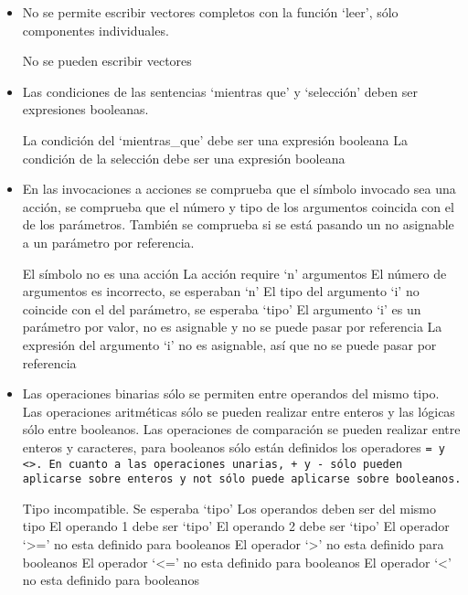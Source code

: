 \begin{itemize}
    \item No se permite escribir vectores completos con la función `leer', sólo componentes individuales.

    \begin{codigo}
    No se pueden escribir vectores
    \end{codigo}


    \item Las condiciones de las sentencias `mientras que' y `selección' deben ser expresiones booleanas.

    \begin{codigo}
    La condición del `mientras_que' debe ser una expresión booleana
    La condición de la selección debe ser una expresión booleana
    \end{codigo}


    \item En las invocaciones a acciones se comprueba que el símbolo invocado sea una acción, se comprueba que el número y tipo de los argumentos coincida con el de los parámetros. También se comprueba si se está pasando un no asignable a un parámetro por referencia.

    \begin{codigo}
    El símbolo no es una acción
    La acción require `n' argumentos
    El número de argumentos es incorrecto, se esperaban `n'
    El tipo del argumento `i' no coincide con el del parámetro, se esperaba `tipo'
    El argumento `i' es un parámetro por valor, no es asignable y no se puede pasar por referencia
    La expresión del argumento `i' no es asignable, así que no se puede pasar por referencia
    \end{codigo}


\item Las operaciones binarias sólo se permiten entre operandos del mismo tipo. Las operaciones aritméticas sólo se pueden realizar entre enteros y las lógicas sólo entre booleanos. Las operaciones de comparación se pueden realizar entre enteros y caracteres, para booleanos sólo están definidos los operadores \tt{=} y \tt{<>}. En cuanto a las operaciones unarias, \tt{+} y \tt{-} sólo pueden aplicarse sobre enteros y \tt{not} sólo puede aplicarse sobre booleanos.

    \begin{codigo}
    Tipo incompatible. Se esperaba `tipo'
    Los operandos deben ser del mismo tipo
    El operando 1 debe ser `tipo'
    El operando 2 debe ser `tipo'
    El operador `>=' no esta definido para booleanos
    El operador `>' no esta definido para booleanos
    El operador `<=' no esta definido para booleanos
    El operador `<' no esta definido para booleanos
    \end{codigo}



\end{itemize}
